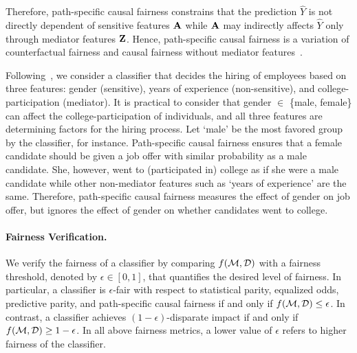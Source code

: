 Therefore, path-specific causal fairness constrains that the prediction $ \widehat{Y} $ is not directly dependent of sensitive features $ \mathbf{A} $ while $ \mathbf{A} $ may indirectly affects $ \widehat{Y} $ only through mediator features $ \mathbf{Z} $. Hence, path-specific causal fairness is a variation of counterfactual fairness and causal fairness without mediator features~\cite{bastani2019probabilistic}. 




\begin{example}
	\normalfont
	Following~\cite{bastani2019probabilistic}, we consider a classifier that decides the hiring of employees based on three features: gender (sensitive), years of experience (non-sensitive), and college-participation (mediator). It is practical to consider that gender $ \in $ \{male, female\} can affect the college-participation of individuals, and all three features are determining factors for the hiring process. Let `male' be the most favored group by the classifier, for instance. Path-specific causal fairness ensures that a female candidate should be given a job offer with similar probability as a male candidate. She,  however,  went to (participated in) college as if she were a male candidate while other non-mediator features such as  `years of experience' are the same.  Therefore, path-specific causal fairness measures the effect of gender on job offer, but ignores the effect of gender on whether candidates went to college.
\end{example}	



\paragraph{Fairness Verification.} We verify the fairness of a classifier by comparing $ f(\mathcal{M}, \mathcal{D}) $ with a fairness threshold, denoted by $ \epsilon \in [0,1] $, that quantifies the desired level of fairness. In particular, a classifier is $ \epsilon $-fair with respect to statistical parity, equalized odds, predictive parity, and path-specific causal fairness if and only if $ f(\mathcal{M}, \mathcal{D}) \le \epsilon $. In contrast, a classifier achieves $(1 - \epsilon)$-disparate impact  if and only if $ f(\mathcal{M}, \mathcal{D}) \ge 1 - \epsilon $. In all above fairness metrics, a lower value of $ \epsilon $ refers to higher fairness of the classifier.


